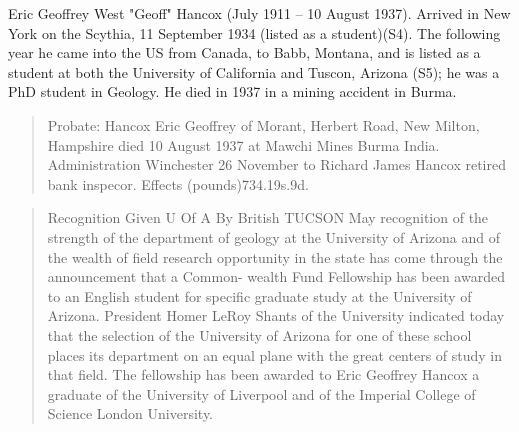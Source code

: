

Eric Geoffrey West "Geoff" Hancox (July 1911 -- 10 August 1937). Arrived in New York on the Scythia, 11 September 1934 (listed as a student)(S4). The following year he came into the US from Canada, to Babb, Montana, and is listed as a student at both the University of California and Tuscon, Arizona (S5); he was a PhD student in Geology. He died in 1937 in a mining accident in Burma.

\begin{quotation}
Probate: Hancox Eric Geoffrey of Morant, Herbert Road, New Milton, Hampshire died 10 August 1937 at Mawchi Mines Burma India. Administration Winchester 26 November to Richard James Hancox retired bank inspecor. Effects (pounds)734.19s.9d.
\end{quotation}

\begin{quotation}
Recognition Given U Of A By British TUCSON May recognition of the strength of the department of geology at the University of Arizona and of the wealth of field research opportunity in the state has come through the announcement that a Common- wealth Fund Fellowship has been awarded to an English student for specific graduate study at the University of Arizona. President Homer LeRoy Shants of the University indicated today that the selection of the University of Arizona for one of these school places its department on an equal plane with the great centers of study in that field. The fellowship has been awarded to Eric Geoffrey Hancox a graduate of the University of Liverpool and of the Imperial College of Science London University.
\end{quotation}
